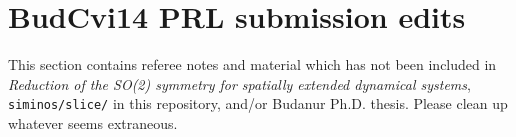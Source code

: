 
\section{BudCvi14 PRL submission edits}

This section contains referee notes and
material which has not been included in
\emph{Reduction of the SO(2) symmetry for spatially extended dynamical
systems}, {\tt siminos/slice/} in this repository,  and/or
Budanur Ph.D. thesis.
Please clean up whatever seems extraneous.


